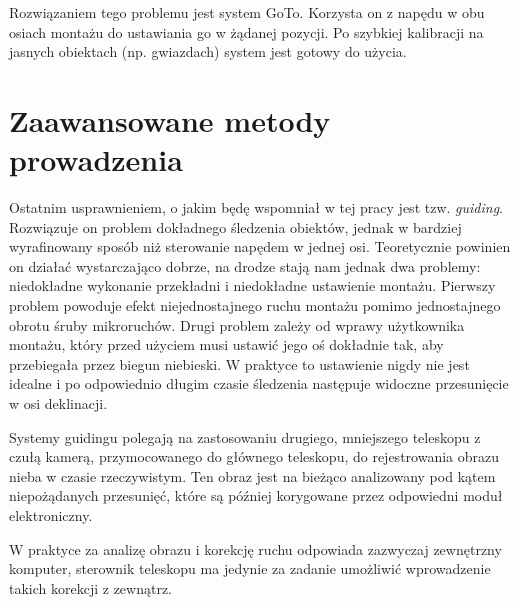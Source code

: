 Rozwiązaniem tego problemu jest system GoTo. Korzysta on z napędu w obu osiach
montażu do ustawiania go w żądanej pozycji. Po szybkiej kalibracji na jasnych
obiektach (np. gwiazdach) system jest gotowy do użycia.

\section{Zaawansowane metody prowadzenia}

Ostatnim usprawnieniem, o jakim będę wspomniał w tej pracy jest tzw.
\emph{guiding}.  Rozwiązuje on problem dokładnego śledzenia obiektów, jednak
w bardziej wyrafinowany sposób niż sterowanie napędem w jednej osi. Teoretycznie
powinien on działać wystarczająco dobrze, na drodze stają nam jednak dwa
problemy: niedokładne wykonanie przekładni i niedokładne ustawienie montażu.
Pierwszy problem powoduje efekt niejednostajnego ruchu montażu pomimo
jednostajnego obrotu śruby mikroruchów. Drugi problem zależy od wprawy
użytkownika montażu, który przed użyciem musi ustawić jego oś dokładnie tak, aby
przebiegała przez biegun niebieski. W praktyce to ustawienie nigdy nie jest
idealne i po odpowiednio długim czasie śledzenia następuje widoczne przesunięcie
w osi deklinacji.

Systemy guidingu polegają na zastosowaniu drugiego, mniejszego teleskopu
z czułą kamerą, przymocowanego do głównego teleskopu, do rejestrowania obrazu
nieba w czasie rzeczywistym. Ten obraz jest na bieżąco analizowany pod kątem
niepożądanych przesunięć, które są później korygowane przez odpowiedni moduł
elektroniczny.

W praktyce za analizę obrazu i korekcję ruchu odpowiada zazwyczaj zewnętrzny
komputer, sterownik teleskopu ma jedynie za zadanie umożliwić wprowadzenie
takich korekcji z zewnątrz.
